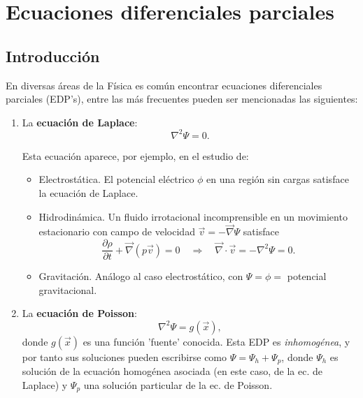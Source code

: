 \chapter{Ecuaciones diferenciales parciales}

\section{Introducción}

En diversas áreas de la Física es común encontrar ecuaciones diferenciales parciales (EDP's), entre las más frecuentes pueden ser mencionadas las siguientes:

\begin{enumerate}
    \item La \textbf{ecuación de Laplace}:
    \begin{equation}
            \nabla^2 \Psi = 0. \label{EcLaplace}
    \end{equation}
    
    Esta ecuación aparece, por ejemplo, en el estudio de:
    
    \begin{itemize}
        \item Electrostática. El potencial eléctrico $\phi$ en una región sin cargas satisface la ecuación de Laplace.
        
        \item Hidrodinámica. Un fluido irrotacional incomprensible en un movimiento estacionario con campo de velocidad $\Vec{v} = - \Vec{\nabla} \Psi$ satisface
        \begin{equation}
          \frac{\partial \rho}{\partial t} + \Vec{\nabla}(p \Vec{v}) = 0 \quad \Rightarrow \quad \Vec{\nabla} \cdot \Vec{v} = - \nabla^2 \Psi = 0.  
        \end{equation}
        
        \item Gravitación. Análogo al caso electrostático, con $\Psi = \phi = $ potencial gravitacional.
    \end{itemize}
    
    \item La \textbf{ecuación de Poisson}:
        \begin{equation}
            \nabla^2 \Psi = g(\Vec{x}), \label{EcPoisson}
    \end{equation}
    donde $g(\Vec{x})$ es una función 'fuente' conocida. Esta EDP es \textit{inhomogénea}, y por tanto sus soluciones pueden escribirse como $\Psi = \Psi_h + \Psi_p$, donde $\Psi_h$ es solución de la ecuación homogénea asociada (en este caso, de la ec. de Laplace) y $\Psi_p$ una solución particular de la ec. de Poisson.
    

\end{enumerate}
